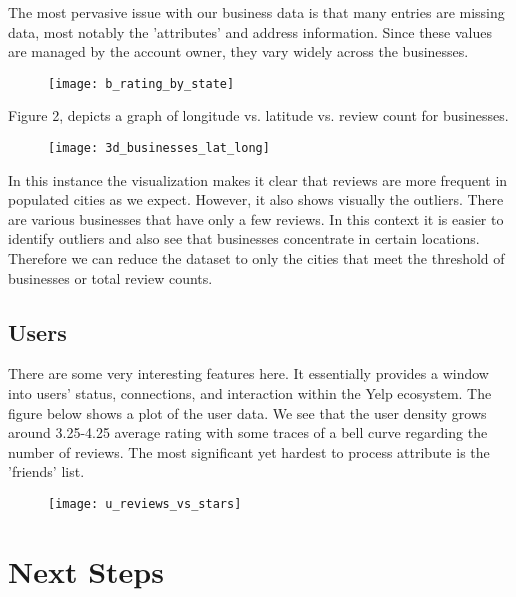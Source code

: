 \quad The most pervasive issue with our business data is that many entries are missing data, most notably the 'attributes' and address information. Since these values are managed by the account owner, they vary widely across the businesses.

\begin{figure}[h]
\texttt{[image: b\_rating\_by\_state]}
\end{figure}

Figure 2, depicts a graph of longitude vs. latitude vs. review count for businesses. 

\begin{figure}[!h]
\texttt{[image: 3d\_businesses\_lat\_long]}
\end{figure}

In this instance the visualization makes it clear that reviews are more frequent in populated cities as we expect. However, it also shows visually the outliers. There are various businesses that have only a few reviews. In this context it is easier to identify outliers and also see that businesses concentrate in certain locations. Therefore we can reduce the dataset to only the cities that meet the threshold of businesses or total review counts. 

\subsection{Users}

\quad There are some very interesting features here. It essentially provides a window into users' status, connections, and interaction within the Yelp ecosystem. The figure below shows a plot of the user data. We see that the user density grows around 3.25-4.25 average rating with some traces of a bell curve regarding the number of reviews. The most significant yet hardest to process attribute is the 'friends' list. 

\begin{figure}[!h]
\texttt{[image: u\_reviews\_vs\_stars]}
\end{figure}

\quad
\section{Next Steps}

